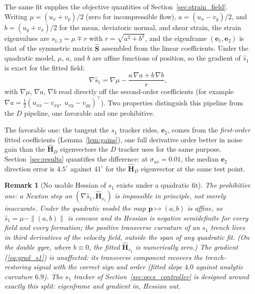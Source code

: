 \documentclass[lettersize,journal]{IEEEtran}
\newtheorem{remark}{Remark}
\begin{document}
The same fit supplies the objective quantities of
Section~\ref{sec:strain_field}. Writing $\mu = (u_x + v_y)/2$ (zero for
incompressible flow), $a = (u_x - v_y)/2$, and $b = (u_y + v_x)/2$ for
the mean, deviatoric normal, and shear strain, the strain eigenvalues
are $s_{1,2} = \mu \mp r$ with $r = \sqrt{a^2 + b^2}$, and the
eigenframe $(\mathbf{e}_1, \mathbf{e}_2)$ is that of the symmetric
matrix $\hat{\mathbf{S}}$ assembled from the linear coefficients. Under
the quadratic model, $\mu$, $a$, and $b$ are affine functions of
position, so the gradient of $\hat{s}_1$ is exact for the fitted field:
\begin{equation}
    \nabla \hat{s}_1 = \nabla\mu
    - \frac{a\,\nabla a + b\,\nabla b}{r},
    \label{eq:grad_s1}
\end{equation}
with $\nabla\mu$, $\nabla a$, $\nabla b$ read directly off the
second-order coefficients (for example $\nabla a = \tfrac{1}{2}(u_{xx} -
v_{xy},\; u_{xy} - v_{yy})^\top$). Two properties distinguish this
pipeline from the $D$ pipeline, one favorable and one prohibitive.

The favorable one: the tangent the $s_1$ tracker rides,
$\mathbf{e}_2$, comes from the \emph{first-order} fitted coefficients
(Lemma~\ref{lem:gains}), one full derivative order better in noise gain
than the $\hat{\mathbf{H}}_D$ eigenvectors the $D$ tracker uses for the
same purpose. Section~\ref{sec:results} quantifies the difference: at
$\sigma_{uv} = 0.01$, the median $\mathbf{e}_2$ direction error is
$4.5^\circ$ against $41^\circ$ for the $\hat{\mathbf{H}}_D$ eigenvector
at the same test point.

\begin{remark}[No usable Hessian of $s_1$ exists under a quadratic fit]
\label{rem:s1hess}
The prohibitive one: a Newton step on $(\nabla \hat{s}_1,
\hat{\mathbf{H}}_{s_1})$ is impossible in principle, not merely
inaccurate. Under the quadratic model the map $\mathbf{p} \mapsto (a,
b)$ is affine, so $\hat{s}_1 = \mu - \|(a, b)\|$ is concave and its
Hessian is negative semidefinite \emph{for every field and every
formation}; the positive transverse curvature of an $s_1$ trench lives
in third derivatives of the velocity field, outside the span of any
quadratic fit. (On the double gyre, where $b \equiv 0$, the fitted
$\hat{\mathbf{H}}_{s_1}$ is numerically zero.) The gradient
(\ref{eq:grad_s1}) is unaffected: its transverse component recovers the
trench-restoring signal with the correct sign and order (fitted slope
$4.0$ against analytic curvature $6.9$). The $s_1$ tracker of
Section~\ref{sec:oecs_controller} is designed around exactly this
split: eigenframe and gradient in, Hessian out.
\end{remark}
\end{document}
